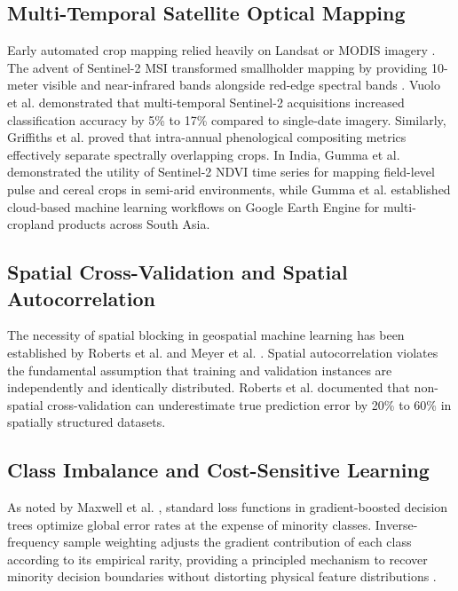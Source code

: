 \documentclass[runningheads]{llncs}
\begin{document}
\subsection{Multi-Temporal Satellite Optical Mapping}
Early automated crop mapping relied heavily on Landsat or MODIS imagery \cite{inglada2015,gumma2022}. The advent of Sentinel-2 MSI transformed smallholder mapping by providing 10-meter visible and near-infrared bands alongside red-edge spectral bands \cite{defourny2019}. Vuolo et al. \cite{vuolo2018} demonstrated that multi-temporal Sentinel-2 acquisitions increased classification accuracy by 5\% to 17\% compared to single-date imagery. Similarly, Griffiths et al. \cite{griffiths2019} proved that intra-annual phenological compositing metrics effectively separate spectrally overlapping crops. In India, Gumma et al. \cite{gumma2020} demonstrated the utility of Sentinel-2 NDVI time series for mapping field-level pulse and cereal crops in semi-arid environments, while Gumma et al. \cite{gumma2022} established cloud-based machine learning workflows on Google Earth Engine for multi-cropland products across South Asia.

\subsection{Spatial Cross-Validation and Spatial Autocorrelation}
The necessity of spatial blocking in geospatial machine learning has been established by Roberts et al. \cite{roberts2017} and Meyer et al. \cite{meyer2018}. Spatial autocorrelation violates the fundamental assumption that training and validation instances are independently and identically distributed. Roberts et al. \cite{roberts2017} documented that non-spatial cross-validation can underestimate true prediction error by 20\% to 60\% in spatially structured datasets.

\subsection{Class Imbalance and Cost-Sensitive Learning}
As noted by Maxwell et al. \cite{maxwell2018}, standard loss functions in gradient-boosted decision trees optimize global error rates at the expense of minority classes. Inverse-frequency sample weighting adjusts the gradient contribution of each class according to its empirical rarity, providing a principled mechanism to recover minority decision boundaries without distorting physical feature distributions \cite{chen2016,maxwell2018}.
\end{document}
